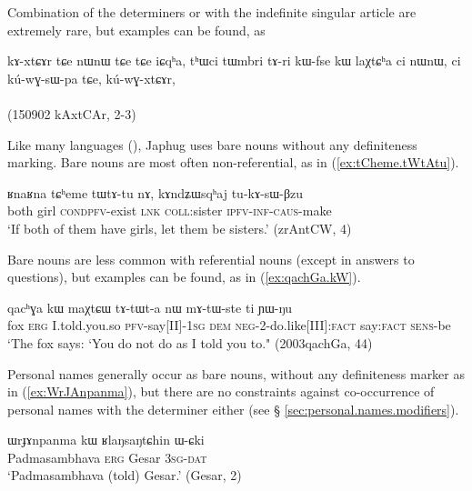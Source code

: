 Combination of the determiners  or  with the indefinite singular article  are extremely rare, but examples can be found, as 

\begin{exe}
\ex 
\gll  kɤ-xtɕɤr tɕe nɯnɯ tɕe tɕe iɕqʰa, tʰɯci tɯmbri tɤ-ri kɯ-fse kɯ laχtɕʰa ci nɯnɯ, ci kú-wɣ-sɯ-pa tɕe, kú-wɣ-xtɕɤr, \\
\\
\glt (150902 kAxtCAr, 2-3)
\end{exe}
 

Like many languages (\citealt[130]{creissels06sgit1}), Japhug  uses bare nouns without any definiteness marking. Bare nouns are most often non-referential, as  in (\ref{ex:tCheme.tWtAtu}).

\begin{exe}
\ex \label{ex:tCheme.tWtAtu}
\gll ʁnaʁna tɕʰeme tɯ\redp{}tɤ-tu nɤ, kɤndʑɯsqʰaj tu-kɤ-sɯ-βzu \\
both girl \textsc{cond}\redp{}\textsc{pfv}-exist \textsc{lnk} \textsc{coll}:sister \textsc{ipfv}-\textsc{inf}-\textsc{caus}-make \\
\glt `If both of them have girls, let them be sisters.' (zrAntCW, 4)
\end{exe}

Bare nouns are less common with referential nouns (except in answers to questions), but examples can be found, as  in (\ref{ex:qachGa.kW}).

\begin{exe}
\ex \label{ex:qachGa.kW}
\gll qacʰɣa 	kɯ maχtɕɯ tɤ-tɯt-a nɯ mɤ-tɯ-ste ti ɲɯ-ŋu \\
fox \textsc{erg} I.told.you.so \textsc{pfv}-say[II]-\textsc{1sg} \textsc{dem} \textsc{neg}-2-do.like[III]:\textsc{fact} say:\textsc{fact} \textsc{sens}-be \\
\glt `The fox says: `You do not do as I told you to." (2003qachGa, 44)
\end{exe}

Personal names generally occur as bare nouns, without any definiteness marker as in (\ref{ex:WrJAnpanma}), but there are no constraints against co-occurrence of personal names with the determiner  either (see § \ref{sec:personal.names.modifiers}).

\begin{exe}
\ex \label{ex:WrJAnpanma}
\gll  ɯrɟɤnpanma kɯ ʁlaŋsaŋtɕhin ɯ-ɕki  \\
 Padmasambhava \textsc{erg} Gesar \textsc{3sg}-\textsc{dat} \\
\glt `Padmasambhava (told) Gesar.' (Gesar, 2)
\end{exe}

